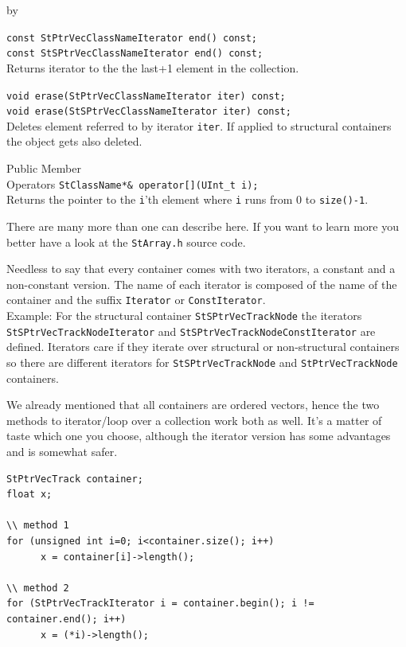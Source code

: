 \documentclass[twoside]{article}
\newcommand{\entrylabel}[1]{\mbox{\textbf{{#1}}}\hfil}%
\newenvironment{entry}
{\begin{list}{}%
    {\renewcommand{\makelabel}{\entrylabel}%
     \setlength{\labelwidth}{90pt}%
     \setlength{\leftmargin}{\labelwidth}
     \advance\leftmargin by \labelsep%
      }%
    }%
  {\end{list}}
\newcommand{\Entrylabel}[1]%
{\raisebox{0pt}[1ex][0pt]{\makebox[\labelwidth][l]%
    {\parbox[t]{\labelwidth}{\hspace{0pt}\textbf{{#1}}}}}}
\newenvironment{Entry}%
{\renewcommand{\entrylabel}{\Entrylabel}\begin{entry}}%
  {\end{entry}}
\begin{document}
\begin{Entry}
    \verb+const StPtrVecClassNameIterator end() const;+\\
    \verb+const StSPtrVecClassNameIterator end() const;+\\
    Returns iterator to the the last+1 element in the collection.
    
    \verb+void erase(StPtrVecClassNameIterator iter) const;+\\
    \verb+void erase(StSPtrVecClassNameIterator iter) const;+\\
    Deletes element referred to by iterator \texttt{iter}.  If applied
    to structural containers the object gets also deleted.
    
\item[Public Member\\ Operators]
    \verb+StClassName*& operator[](UInt_t i);+\\
    Returns the pointer to the \texttt{i}'th element where \texttt{i}
    runs from 0 to \texttt{size()-1}.
\end{Entry}
There are many more than one can describe here.  If you want to learn
more you better have a look at the \texttt{StArray.h} source code.

Needless to say that every container comes with two iterators, a
constant and a non-constant version.  The name of each iterator is
composed of the name of the container and the
suffix \texttt{Iterator} or \texttt{ConstIterator}.\\
Example: For the structural container \texttt{StSPtrVecTrackNode} the
iterators \texttt{StSPtrVecTrackNodeIterator} and
\texttt{StSPtrVecTrackNodeConstIterator} are defined. Iterators care
if they iterate over structural or non-structural containers so there
are different iterators for \texttt{StSPtrVecTrackNode} and
\texttt{StPtrVecTrackNode} containers.

We already mentioned that all containers are ordered vectors, hence
the two methods to iterator/loop over a collection work both as well.
It's a matter of taste which one you choose, although the iterator
version has some advantages and is somewhat safer.

\begin{verbatim}
StPtrVecTrack container;
float x;

\\ method 1
for (unsigned int i=0; i<container.size(); i++)
      x = container[i]->length();

\\ method 2
for (StPtrVecTrackIterator i = container.begin(); i != container.end(); i++)
      x = (*i)->length();
\end{verbatim}
\end{document}
